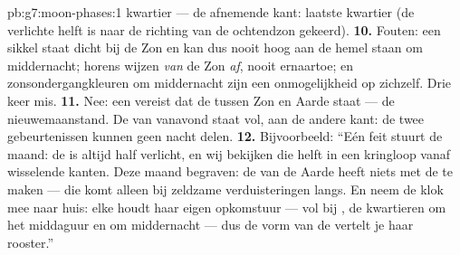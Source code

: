 \begin{solution}{pb:g7:moon-phases:1}
kwartier --- de afnemende kant: laatste kwartier (de verlichte helft
is naar de richting van de ochtendzon gekeerd).
\textbf{10.} Fouten: een sikkel staat dicht bij de Zon en kan dus
nooit hoog aan de hemel staan om middernacht; horens wijzen \emph{van}
de Zon \emph{af}, nooit ernaartoe; en zonsondergangkleuren om
middernacht zijn een onmogelijkheid op zichzelf. Drie keer mis.
\textbf{11.} Nee: een  vereist dat de 
tussen Zon en Aarde staat --- de nieuwemaanstand. De  van
vanavond staat vol, aan de andere kant: de twee gebeurtenissen kunnen
geen nacht delen.
\textbf{12.} Bijvoorbeeld: ``Eén feit stuurt de maand: de  is
altijd half verlicht, en wij bekijken die helft in een kringloop vanaf
wisselende kanten. Deze maand begraven: de  van de Aarde heeft
niets met de  te maken --- die komt alleen bij
zeldzame verduisteringen langs. En neem de klok mee naar huis: elke
 houdt haar eigen opkomstuur --- vol bij
, de kwartieren om het middaguur en om middernacht ---
dus de vorm van de  vertelt je haar rooster.''
\end{solution}
